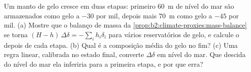 \begin{exercise}[$\star\star\star$]\label{exo:b2:climate-proxies:12}
Um manto de gelo cresce em duas etapas: primeiro \qty{60}{m} de nível do mar são armazenados como gelo a $-30$ por mil,
depois mais \qty{70}{m} como gelo a $-45$ por mil. (a) Mostre que o balanço de massa da
\cref{prop:b2:climate-proxies:mass-balance} se torna $(H - h)\,\Delta\delta = -\sum_i h_i\delta_i$
para vários reservatórios de gelo, e calcule o  depois de cada etapa. (b) Qual é a composição
média do gelo no fim? (c) Uma regra linear, calibrada no estado final, converte
$\Delta\delta$ em nível do mar. Que descida do nível do mar ela inferiria para a primeira etapa, e por que
erra?
\end{exercise}

